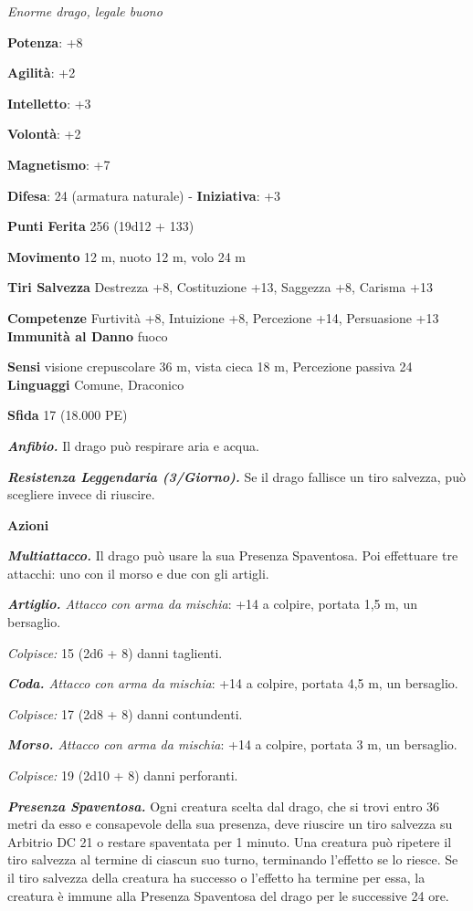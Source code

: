 \begin{multicols}{2}
\emph{Enorme drago, legale buono}

\textbf{Potenza}: +8

\textbf{Agilità}: +2

\textbf{Intelletto}: +3

\textbf{Volontà}: +2

\textbf{Magnetismo}: +7

\textbf{Difesa}: 24 (armatura naturale) - \textbf{Iniziativa}: +3

\textbf{Punti Ferita} 256 (19d12 + 133)

\textbf{Movimento} 12 m, nuoto 12 m, volo 24 m

\textbf{Tiri Salvezza} Destrezza +8, Costituzione +13, Saggezza +8,
Carisma +13

\textbf{Competenze} Furtività +8, Intuizione +8, Percezione +14,
Persuasione +13 \textbf{Immunità al Danno} fuoco

\textbf{Sensi} visione crepuscolare 36 m, vista cieca 18 m, Percezione passiva
24 \textbf{Linguaggi} Comune, Draconico

\textbf{Sfida} 17 (18.000 PE)

\emph{\textbf{Anfibio.}} Il drago può respirare aria e acqua.

\emph{\textbf{Resistenza Leggendaria (3/Giorno).}} Se il drago fallisce
un tiro salvezza, può scegliere invece di riuscire.

\textbf{Azioni}

\emph{\textbf{Multiattacco.}} Il drago può usare la sua Presenza
Spaventosa. Poi effettuare tre attacchi: uno con il morso e due con gli
artigli.

\emph{\textbf{Artiglio.} Attacco con arma da mischia}: +14 a colpire,
portata 1,5 m, un bersaglio.

\emph{Colpisce:} 15 (2d6 + 8) danni taglienti.

\emph{\textbf{Coda.} Attacco con arma da mischia}: +14 a colpire,
portata 4,5 m, un bersaglio.

\emph{Colpisce:} 17 (2d8 + 8) danni contundenti.

\emph{\textbf{Morso.} Attacco con arma da mischia}: +14 a colpire,
portata 3 m, un bersaglio.

\emph{Colpisce:} 19 (2d10 + 8) danni perforanti.

\emph{\textbf{Presenza Spaventosa.}} Ogni creatura scelta dal drago, che
si trovi entro 36 metri da esso e consapevole della sua presenza, deve
riuscire un tiro salvezza su Arbitrio DC 21 o restare spaventata per 1
minuto. Una creatura può ripetere il tiro salvezza al termine di ciascun
suo turno, terminando l'effetto se lo riesce. Se il tiro salvezza della
creatura ha successo o l'effetto ha termine per essa, la creatura è
immune alla Presenza Spaventosa del drago per le successive 24 ore.


\end{multicols}
